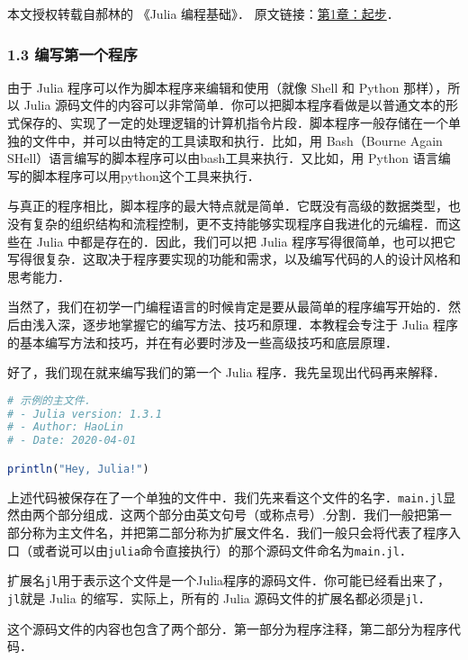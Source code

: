 
本文授权转载自郝林的 《Julia 编程基础》． 原文链接：\href{https://github.com/hyper0x/JuliaBasics/blob/master/book/ch01.md}{第1章：起步}．


\subsubsection{1.3 编写第一个程序}

由于 Julia 程序可以作为脚本程序来编辑和使用（就像 Shell 和 Python 那样），所以 Julia 源码文件的内容可以非常简单．你可以把脚本程序看做是以普通文本的形式保存的、实现了一定的处理逻辑的计算机指令片段．脚本程序一般存储在一个单独的文件中，并可以由特定的工具读取和执行．比如，用 Bash（Bourne Again SHell）语言编写的脚本程序可以由bash工具来执行．又比如，用 Python 语言编写的脚本程序可以用python这个工具来执行．

与真正的程序相比，脚本程序的最大特点就是简单．它既没有高级的数据类型，也没有复杂的组织结构和流程控制，更不支持能够实现程序自我进化的元编程．而这些在 Julia 中都是存在的．因此，我们可以把 Julia 程序写得很简单，也可以把它写得很复杂．这取决于程序要实现的功能和需求，以及编写代码的人的设计风格和思考能力．

当然了，我们在初学一门编程语言的时候肯定是要从最简单的程序编写开始的．然后由浅入深，逐步地掌握它的编写方法、技巧和原理．本教程会专注于 Julia 程序的基本编写方法和技巧，并在有必要时涉及一些高级技巧和底层原理．

好了，我们现在就来编写我们的第一个 Julia 程序．我先呈现出代码再来解释．

\begin{lstlisting}[language=julia]
# 示例的主文件．
# - Julia version: 1.3.1
# - Author: HaoLin
# - Date: 2020-04-01

println("Hey, Julia!")
\end{lstlisting}

上述代码被保存在了一个单独的文件中．我们先来看这个文件的名字．\verb|main.jl|显然由两个部分组成．这两个部分由英文句号（或称点号）.分割．我们一般把第一部分称为主文件名，并把第二部分称为扩展文件名．我们一般只会将代表了程序入口（或者说可以由\verb|julia|命令直接执行）的那个源码文件命名为\verb|main.jl|．

扩展名\verb|jl|用于表示这个文件是一个Julia程序的源码文件．你可能已经看出来了，\verb|jl|就是 Julia 的缩写．实际上，所有的 Julia 源码文件的扩展名都必须是\verb|jl|．

这个源码文件的内容也包含了两个部分．第一部分为程序注释，第二部分为程序代码．

